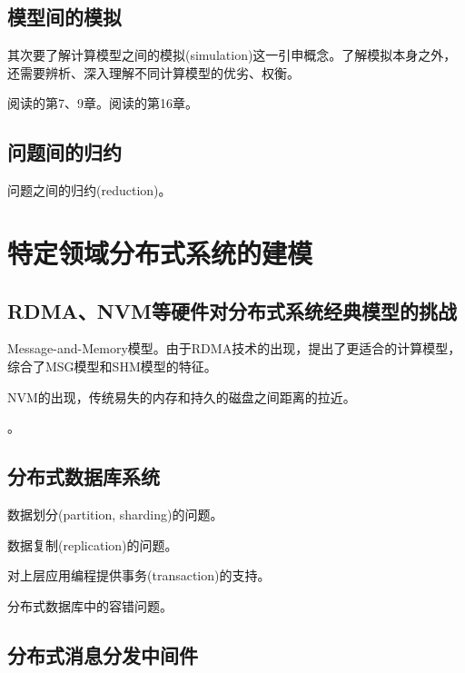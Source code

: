 \subsection{模型间的模拟}


其次要了解计算模型之间的模拟(simulation)这一引申概念。了解模拟本身之外，还需要辨析、深入理解不同计算模型的优劣、权衡。

\myleaf 阅读\cite{Attiya04}的第7、9章。阅读\cite{Aspnes19}的第16章。


\subsection{问题间的归约}

问题之间的归约(reduction)。

\section{特定领域分布式系统的建模}

\subsection{RDMA、NVM等硬件对分布式系统经典模型的挑战}


Message-and-Memory模型。由于RDMA技术的出现，提出了更适合的计算模型，综合了MSG模型和SHM模型的特征。

NVM的出现，传统易失的内存和持久的磁盘之间距离的拉近。

\myleaf \cite{Aguilera19}。

\subsection{分布式数据库系统}

数据划分(partition, sharding)的问题。

数据复制(replication)的问题。

对上层应用编程提供事务(transaction)的支持。

分布式数据库中的容错问题。


\subsection{分布式消息分发中间件}

